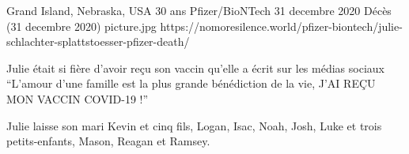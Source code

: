 {Grand Island, Nebraska, USA}
{30 ans}
{Pfizer/BioNTech}
{31 decembre 2020}
{Décès (31 decembre 2020)}
{picture.jpg}
{https://nomoresilence.world/pfizer-biontech/julie-schlachter-splattstoesser-pfizer-death/}
{

Julie était si fière d'avoir reçu son vaccin qu'elle a écrit sur les médias
sociaux “L'amour d'une famille est la plus grande bénédiction de la vie, J'AI
REÇU MON VACCIN COVID-19 !”

Julie laisse son mari Kevin et cinq fils, Logan, Isac, Noah, Josh, Luke et trois
petits-enfants, Mason, Reagan et Ramsey.

}
